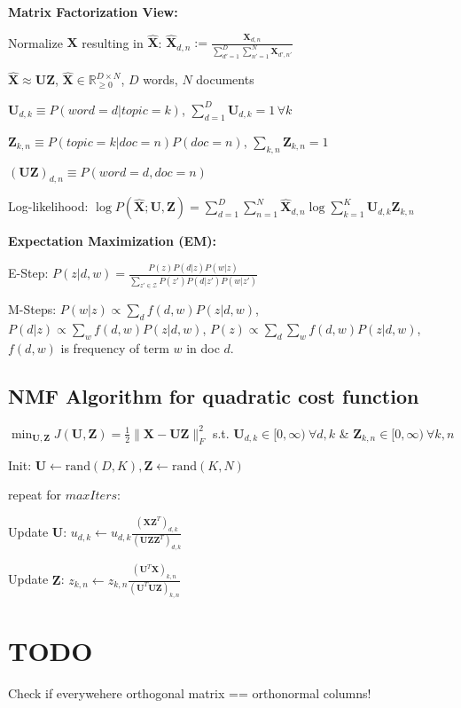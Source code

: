 \documentclass[a4paper, 11pt, landscape]{article}
\begin{document}
\begin{multicols*}{3}
\textbf{Matrix Factorization View:}
\begin{inparaitem}
	\item Normalize $\mathbf{X}$ resulting in $\hat{\mathbf{X}}$: $\hat{\mathbf{X}}_{d, n} := \frac{\mathbf{X}_{d,n}}{\sum_{d'=1}^D \sum_{n'=1}^N \mathbf{X}_{d', n'}}$
	\item $\hat{\mathbf{X}} \approx \mathbf{U} \mathbf{Z}$, $\hat{\mathbf{X}} \in \mathbb{R}^{D \times N}_{\geq 0}$, $D$ words, $N$ documents
	\item $\mathbf{U}_{d, k} \equiv P(\mathit{word}=d | \mathit{topic} = k)$, $\sum_{d=1}^D \mathbf{U}_{d,k} = 1\, \forall k$
	\item $\mathbf{Z}_{k,n} \equiv P(\mathit{topic} = k | \mathit{doc} = n) P(\mathit{doc} = n)$, $\sum_{k, n} \mathbf{Z}_{k,n} = 1$
	\item $(\mathbf{U}\mathbf{Z})_{d, n} \equiv P(\mathit{word = d}, \mathit{doc} = n)$
	\item Log-likelihood: $\log P(\hat{\mathbf{X}}; \mathbf{U}, \mathbf{Z}) = \sum_{d=1}^D \sum_{n=1}^N \hat{\mathbf{X}}_{d,n} \log \sum_{k=1}^K \mathbf{U}_{d, k} \mathbf{Z}_{k, n}$
\end{inparaitem}

\textbf{Expectation Maximization (EM):}
\begin{compactenum}
	\item E-Step: $P(z|d, w) = \frac{P(z)P(d|z)P(w|z)}{\sum_{z' \in \mathcal{Z}} P(z') P(d|z') P(w|z')}$
	\item M-Steps: $P(w|z) \propto \sum_{d} f(d, w) P(z|d, w)$, $P(d|z) \propto \sum_{w} f(d, w) P(z|d, w)$, $P(z) \propto \sum_{d} \sum_{w} f(d, w) P(z|d, w)$, $f(d, w)$ is frequency of term $w$ in doc $d$.
\end{compactenum}




\subsection{NMF Algorithm for quadratic cost function}
$\min_{\mathbf{U}, \mathbf{Z}} J(\mathbf{U}, \mathbf{Z}) = \frac{1}{2} \|\mathbf{X} - \mathbf{U}\mathbf{Z}\|_F^2$ s.t. $\mathbf{U}_{d,k} \in [0, \infty)\ \forall d, k$ \&  $\mathbf{Z}_{k, n} \in [0, \infty)\ \forall k, n$
\begin{inparaenum}
	\item Init: $\mathbf{U} \gets \mathrm{rand}(D,K), \mathbf{Z} \gets \mathrm{rand}(K,N)$
	\item repeat for $\mathit{maxIters}$:
	\item Update $\mathbf{U}$: $u_{d,k} \gets u_{d,k} \frac{(\mathbf{X}\mathbf{Z}^T)_{d,k}}{(\mathbf{U}\mathbf{Z}\mathbf{Z}^T)_{d,k}}$
	\item Update $\mathbf{Z}$: $z_{k,n} \gets z_{k,n} \frac{(\mathbf{U}^T\mathbf{X})_{k,n}}{(\mathbf{U}^T\mathbf{U}\mathbf{Z})_{k,n}}$
\end{inparaenum}

\section{TODO}
Check if everywehere orthogonal matrix == orthonormal columns!



\raggedcolumns
\end{multicols*}
\end{document}
